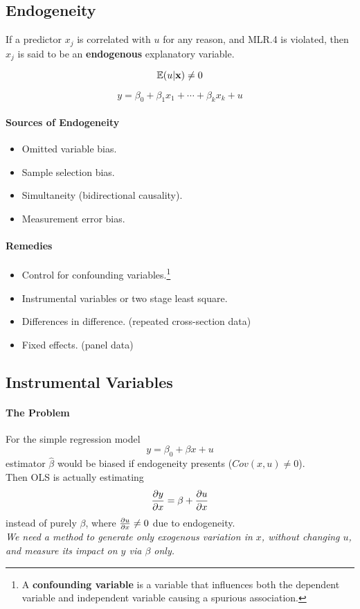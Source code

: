 \documentclass[]{article}
\begin{document}
		\subsection{Endogeneity}
			\begin{definition}
				If a predictor $x_j$ is correlated with $u$ for any reason, and MLR.4 is violated, then $x_j$ is said to be an \textbf{endogenous} explanatory variable.
			\end{definition}
			\[
				\mathbb{E}({u|\textbf{x}}) \neq 0
			\]
			
			\begin{equation}
				y = \beta_0 + \beta_1 x_1 + \cdots + \beta_k x_k + u
			\end{equation}
			
			\paragraph{Sources of Endogeneity}
				\begin{itemize}
					\item Omitted variable bias.
					\item Sample selection bias.
					\item Simultaneity (bidirectional causality).
					\item Measurement error bias.
				\end{itemize}
			\paragraph{Remedies}
				\begin{itemize}
					\item Control for confounding variables.\footnote{A \textbf{confounding variable} is a variable that influences both the dependent variable and independent variable causing a spurious association.}
					\item Instrumental variables or two stage least square.
					\item Differences in difference. (repeated cross-section data)
					\item Fixed effects. (panel data)
				\end{itemize}
		\subsection{Instrumental Variables}
			\paragraph{The Problem} For the simple regression model
			\[
				y = \beta_0 + \beta x + u
			\]
			estimator $\hat{\beta}$ would be biased if endogeneity presents ($Cov(x, u) \neq 0$). \\
			Then OLS is actually estimating 
			\[
				\frac{\partial{y}}{\partial{x}} = \beta + \frac{\partial{u}}{\partial{x}}
			\]
			instead of purely $\beta$, where $\frac{\partial{u}}{\partial{x}} \neq 0$ due to endogeneity.\\
			\emph{We need a method to generate only exogenous variation in $x$, without changing $u$, and measure its impact on $y$ via $\beta$ only.}
			
\end{document}
